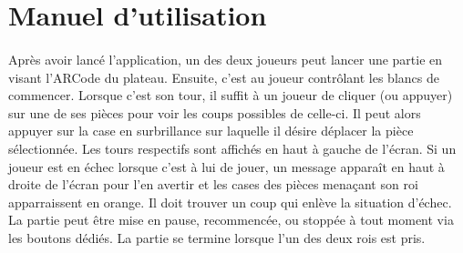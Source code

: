 \documentclass{article}
\begin{document}
\section{Manuel d'utilisation}
\paragraph{}Après avoir lancé l'application, un des deux joueurs peut lancer une partie en visant l'ARCode du plateau. Ensuite, c'est au joueur contrôlant les blancs de commencer. Lorsque c'est son tour, il suffit à un joueur de cliquer (ou appuyer) sur une de ses pièces pour voir les coups possibles de celle-ci. Il peut alors appuyer sur la case en surbrillance sur laquelle il désire déplacer la pièce sélectionnée. Les tours respectifs sont affichés en haut à gauche de l'écran. Si un joueur est en échec lorsque c'est à lui de jouer, un message apparaît en haut à droite de l'écran pour l'en avertir et les cases des pièces menaçant son roi apparraissent en orange. Il doit trouver un coup qui enlève la situation d'échec. La partie peut être mise en pause, recommencée, ou stoppée à tout moment via les boutons dédiés. La partie se termine lorsque l'un des deux rois est pris.
\end{document}
